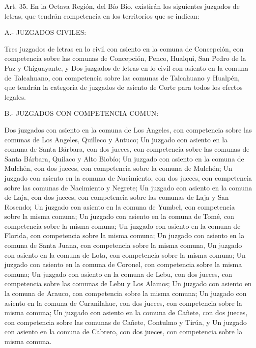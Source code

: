     Art. 35. En la Octava Región, del Bío Bío, existirán los siguientes juzgados de letras, que tendrán competencia en los territorios que se indican:

    A.- JUZGADOS CIVILES:

    Tres juzgados de letras en lo civil con asiento en la comuna de Concepción, con competencia sobre las comunas de Concepción, Penco, Hualqui, San Pedro de la Paz y Chiguayante, y
    Dos juzgados de letras en lo civil con asiento en la comuna de Talcahuano, con competencia sobre las comunas de Talcahuano y Hualpén, que tendrán la categoría de juzgados de asiento de Corte para todos los efectos legales.

    B.- JUZGADOS CON COMPETENCIA COMUN:

    Dos juzgados con asiento en la comuna de Los Angeles, con competencia sobre las comunas de Los Angeles, Quilleco y Antuco;
    Un juzgado con asiento en la comuna de Santa Bárbara, con dos jueces, con competencia sobre las comunas de Santa Bárbara, Quilaco y Alto Biobío;
    Un juzgado con asiento en la comuna de Mulchén, con dos jueces, con competencia sobre la comuna de Mulchén;
    Un juzgado con asiento en la comuna de Nacimiento, con dos jueces, con competencia sobre las comunas de Nacimiento y Negrete;
    Un juzgado con asiento en la comuna de Laja, con dos jueces, con competencia sobre las comunas de Laja y San Rosendo;
    Un juzgado con asiento en la comuna de Yumbel, con competencia sobre la misma comuna;
    Un juzgado con asiento en la comuna de Tomé, con competencia sobre la misma comuna;
    Un juzgado con asiento en la comuna de Florida, con competencia sobre la misma comuna;
    Un juzgado con asiento en la comuna de Santa Juana, con competencia sobre la misma comuna,
    Un juzgado con asiento en la comuna de Lota, con competencia sobre la misma comuna;
    Un juzgado con asiento en la comuna de Coronel, con competencia sobre la misma comuna;
    Un juzgado con asiento en la comuna de Lebu, con dos jueces, con competencia sobre las comunas de Lebu y Los Alamos;
    Un juzgado con asiento en la comuna de Arauco, con competencia sobre la misma comuna;
    Un juzgado con asiento en la comuna de Curanilahue, con dos jueces, con competencia sobre la misma comuna;
    Un juzgado con asiento en la comuna de Cañete, con dos jueces, con competencia sobre las comunas de Cañete, Contulmo y Tirúa, y
    Un juzgado con asiento en la comuna de Cabrero, con dos jueces, con competencia sobre la misma comuna.




